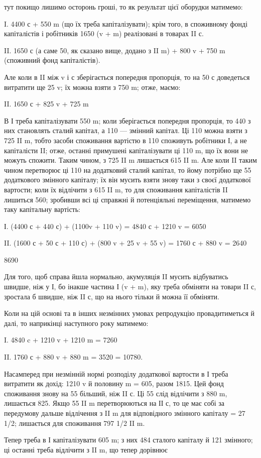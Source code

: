тут покищо лишимо осторонь гроші, то як результат цієї оборудки
матимемо:

I.    4400 с + 550 m (що їх треба капіталізувати); крім того, в споживному
фонді капіталістів і робітників 1650 (v + m) реалізовані в
товарах II с.

II.    1650 с (а саме 50, як сказано вище, додано з II m) + 800 v +
750 m (споживний фонд капіталістів).

Але коли в II між v і с зберігається попередня пропорція, то на 50 с
доведеться витратити ще 25 v; їх можна взяти з 750 m; отже, маємо:

II. 1650 с + 825 v + 725 m

В І треба капіталізувати 550 m; коли зберігається попередня пропорція,
то 440 з них становлять сталий капітал, а 110 — змінний капітал.
Ці 110 можна взяти з 725 II m, тобто засоби споживання вартістю в
110 споживуть робітники І, а не капіталісти II; отже, останні примушені
капіталізувати ці 110 m, що їх вони не можуть спожити. Таким чином,
з 725 II m лишається 615 II m. Але коли II таким чином перетворює
ці 110 на додатковий сталий капітал, то йому потрібно ще 55 додаткового
змінного капіталу; їх він мусить взяти знову таки з своєї додаткової
вартости; коли їх відлічити з 615 II m, то для споживання капіталістів II
лишиться 560; зробивши всі ці справжні й потенціяльні переміщення,
матимемо таку капітальну вартість:

І. (4400 с + 440 с) + (1100v + 110 v) = 4840 с + 1210 v = 6050

II. (1600 с + 50 с + 110 с) + (800 v + 25 v + 55 v) = 1760 с + 880 v = 2640

8690

Для того, щоб справа йшла нормально, акумуляція II мусить відбуватись
швидше, ніж у І, бо інакше частина І (v + m), яку треба обміняти
на товари II с, зростала б швидше, ніж II с, що на нього тільки й можна
її обміняти.

Коли на цій основі та в інших незмінних умовах репродукцію провадитиметься
й далі, то наприкінці наступного року матимемо:

I.    4840 c + 1210 v + 1210 m = 7260

II.    1760 с + 880 v + 880 m = 3520
= 10780.

Насамперед при незмінній нормі розподілу додаткової вартости в І
треба витратити як дохід: 1210 v й половину m = 605, разом 1815.
Цей фонд споживання знову на 55 більший, ніж II с. Ці 55 слід відлічити
з 880 m, лишається 825. Якщо 55 II m перетворюються на ІІ с, то це
має собі за передумову дальше відлічення з II m для відповідного змінного
капіталу = 27 1/2; лишається для споживання 797 1/2 II m.

Тепер треба в І капіталізувати 605 m; з них 484 сталого капіталу й
121 змінного; ці останні треба відлічити з II m, що тепер дорівнює
